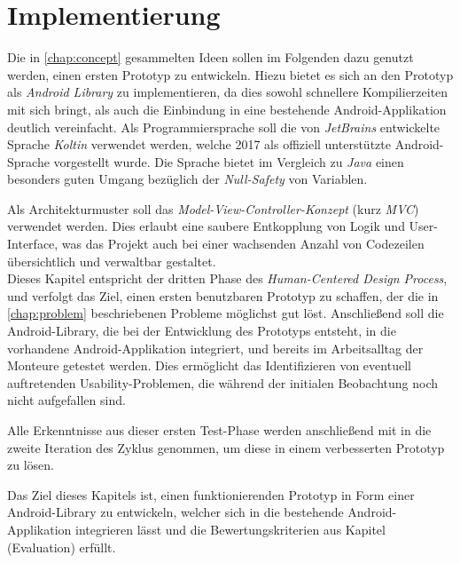 \chapter{Implementierung}

Die in \autoref{chap:concept} gesammelten Ideen sollen im Folgenden dazu genutzt werden, einen ersten Prototyp zu entwickeln.
Hiezu bietet es sich an den Prototyp als \emph{Android Library}  zu implementieren, da dies sowohl schnellere Kompilierzeiten mit sich bringt, als auch die Einbindung in eine bestehende Android-Applikation deutlich vereinfacht.
Als Programmiersprache soll die von \emph{JetBrains} entwickelte Sprache \emph{Koltin} verwendet werden, welche 2017 als offiziell unterstützte Android-Sprache vorgestellt wurde.
Die Sprache bietet im Vergleich zu \emph{Java} einen besonders guten Umgang bezüglich der \emph{Null-Safety} von Variablen. \\

Als Architekturmuster soll das \emph{Model-View-Controller-Konzept} (kurz \emph{MVC}) verwendet werden. 
Dies erlaubt eine saubere Entkopplung von Logik und User-Interface, was das Projekt auch bei einer wachsenden Anzahl von Codezeilen übersichtlich und verwaltbar gestaltet. \\

Dieses Kapitel entspricht der dritten Phase des \emph{Human-Centered Design Process}, und verfolgt das Ziel, einen ersten benutzbaren Prototyp zu schaffen, der die in \autoref{chap:problem} beschriebenen Probleme möglichst gut löst. Anschließend soll die Android-Library, die bei der Entwicklung des Prototyps entsteht, in die vorhandene Android-Applikation integriert, und bereits im Arbeitsalltag der Monteure getestet werden.
Dies ermöglicht das Identifizieren von eventuell auftretenden Usability-Problemen, die während der initialen Beobachtung noch nicht aufgefallen sind.

Alle Erkenntnisse aus dieser ersten Test-Phase werden anschließend mit in die zweite Iteration des Zyklus genommen, um diese in einem verbesserten Prototyp zu lösen.

Das Ziel dieses Kapitels ist, einen funktionierenden Prototyp in Form einer Android-Library zu entwickeln, welcher sich in die bestehende Android-Applikation integrieren lässt und die Bewertungskriterien aus Kapitel (Evaluation) erfüllt.





